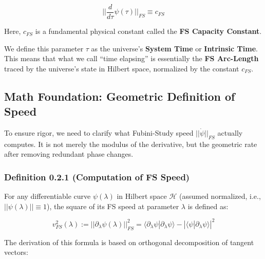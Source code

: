 \documentclass[11pt,a4paper,twoside]{book}
\begin{document}
$$||\frac{d}{d\tau}\psi(\tau)||_{FS} \equiv c_{FS}$$

Here, \textbf{$c_{FS}$} is a fundamental physical constant called the \textbf{FS Capacity Constant}.

We define this parameter \textbf{$\tau$} as the universe's \textbf{System Time} or \textbf{Intrinsic Time}. This means that what we call ``time elapsing'' is essentially the \textbf{FS Arc-Length} traced by the universe's state in Hilbert space, normalized by the constant \textbf{$c_{FS}$}.

\subsection{Math Foundation: Geometric Definition of Speed}

To ensure rigor, we need to clarify what Fubini-Study speed \textbf{$||\dot{\psi}||_{FS}$} actually computes. It is not merely the modulus of the derivative, but the geometric rate after removing redundant phase changes.

\subsubsection{Definition 0.2.1 (Computation of FS Speed)}

For any differentiable curve \textbf{$\psi(\lambda)$} in Hilbert space \textbf{$\mathcal{H}$} (assumed normalized, i.e., \textbf{$||\psi(\lambda)|| \equiv 1$}), the square of its FS speed at parameter \textbf{$\lambda$} is defined as:

$$v_{FS}^2(\lambda) := ||\partial_{\lambda}\psi(\lambda)||_{FS}^2 = \langle \partial_{\lambda}\psi | \partial_{\lambda}\psi \rangle - |\langle \psi | \partial_{\lambda}\psi \rangle|^2$$

The derivation of this formula is based on orthogonal decomposition of tangent vectors:
\end{document}
